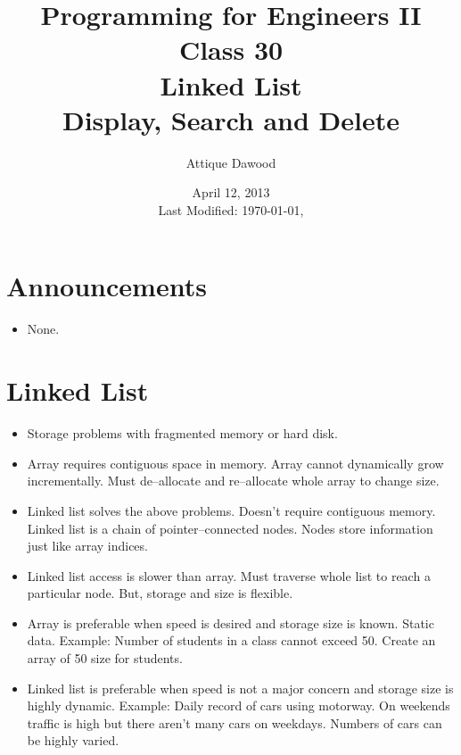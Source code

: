 \documentclass[12pt,a4paper]{article}
\title{\vspace{-2cm}Programming for Engineers II\\Class 30\\Linked List\\Display, Search and Delete}
\author{Attique Dawood}
\date{April 12, 2013\\[0.2cm] Last Modified: \today, \currenttime}
\begin{document}
\maketitle
\section{Announcements}
\begin{itemize}
\item None.
\end{itemize}
\section{Linked List}
\begin{itemize}
\item Storage problems with fragmented memory or hard disk.
\item Array requires contiguous space in memory. Array cannot dynamically grow incrementally. Must de--allocate and re--allocate whole array to change size.
\item Linked list solves the above problems. Doesn't require contiguous memory. Linked list is a chain of pointer--connected nodes. Nodes store information just like array indices.
\item Linked list access is slower than array. Must traverse whole list to reach a particular node. But, storage and size is flexible.
\item Array is preferable when speed is desired and storage size is known. Static data. Example: Number of students in a class cannot exceed 50. Create an array of 50 size for students.
\item Linked list is preferable when speed is not a major concern and storage size is highly dynamic. Example: Daily record of cars using motorway. On weekends traffic is high but there aren't many cars on weekdays. Numbers of cars can be highly varied.
\end{itemize}
\end{document}

